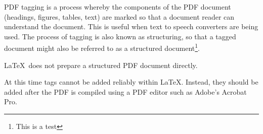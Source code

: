 PDF tagging is a process whereby the components of the PDF document (headings, figures, tables, text) are marked so that a document reader can understand the document. This is useful when text to speech converters are being used. The process of tagging is also known as structuring, so that a tagged document might also be referred to as a structured document\footnote{This is a test}.

\LaTeX\ does not prepare a structured PDF document directly.

At this time tags cannot be added reliably within LaTeX. Instead, they should be added after the PDF is compiled using a PDF editor such as Adobe's Acrobat Pro. 
